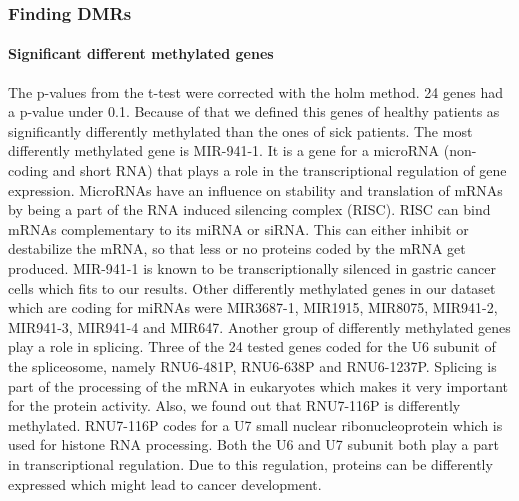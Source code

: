 \documentclass[]{article}
\newenvironment{Shaded}{\begin{snugshade}}{\end{snugshade}}
\newcommand{\KeywordTok}[1]{\textcolor[rgb]{0.13,0.29,0.53}{\textbf{#1}}}
\newcommand{\DataTypeTok}[1]{\textcolor[rgb]{0.13,0.29,0.53}{#1}}
\newcommand{\StringTok}[1]{\textcolor[rgb]{0.31,0.60,0.02}{#1}}
\newcommand{\OperatorTok}[1]{\textcolor[rgb]{0.81,0.36,0.00}{\textbf{#1}}}
\newcommand{\NormalTok}[1]{#1}
\let\oldparagraph\paragraph
\renewcommand{\paragraph}[1]{\oldparagraph{#1}\mbox{}}
\begin{document}
\begin{Shaded}
\end{Shaded}

\subsubsection{Finding DMRs}\label{finding-dmrs}

\paragraph{Significant different methylated
genes}\label{significant-different-methylated-genes}

The p-values from the t-test were corrected with the holm method. 24
genes had a p-value under 0.1. Because of that we defined this genes of
healthy patients as significantly differently methylated than the ones
of sick patients. The most differently methylated gene is MIR-941-1. It
is a gene for a microRNA (non-coding and short RNA) that plays a role in
the transcriptional regulation of gene expression. MicroRNAs have an
influence on stability and translation of mRNAs by being a part of the
RNA induced silencing complex (RISC). RISC can bind mRNAs complementary
to its miRNA or siRNA. This can either inhibit or destabilize the mRNA,
so that less or no proteins coded by the mRNA get produced. MIR-941-1 is
known to be transcriptionally silenced in gastric cancer cells which
fits to our results. Other differently methylated genes in our dataset
which are coding for miRNAs were MIR3687-1, MIR1915, MIR8075, MIR941-2,
MIR941-3, MIR941-4 and MIR647. Another group of differently methylated
genes play a role in splicing. Three of the 24 tested genes coded for
the U6 subunit of the spliceosome, namely RNU6-481P, RNU6-638P and
RNU6-1237P. Splicing is part of the processing of the mRNA in eukaryotes
which makes it very important for the protein activity. Also, we found
out that RNU7-116P is differently methylated. RNU7-116P codes for a U7
small nuclear ribonucleoprotein which is used for histone RNA
processing. Both the U6 and U7 subunit both play a part in
transcriptional regulation. Due to this regulation, proteins can be
differently expressed which might lead to cancer development.
\end{document}
